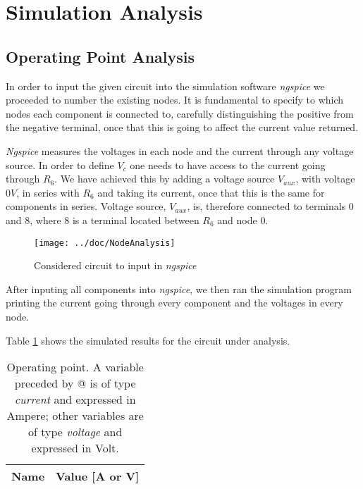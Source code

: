 \section{Simulation Analysis}
\label{sec:simulation}

\subsection{Operating Point Analysis}

In order to input the given circuit into the simulation software \emph{ngspice} we proceeded to number the existing nodes. It is fundamental to specify to which nodes each component is connected to, carefully distinguishing the positive from the negative terminal, once that this is going to affect the current value returned.

\emph{Ngspice} measures the voltages in each node and the current through any voltage source. In order to define $V_c$ one needs to have access to the current going through $R_6$. We have achieved this by adding a voltage source $V_{aux}$, with voltage $0V$, in series with $R_6$ and taking its current, once that this is the same for components in series. Voltage source, $V_{aux}$, is, therefore connected to terminals 0 and 8, where 8 is a terminal located between $R_6$ and node 0.

\begin{figure}[H]
  \centering
  \texttt{[image: ../doc/NodeAnalysis]}
  \caption{Considered circuit to input in \emph{ngspice}}
  \label{fig:fignodos}
\end{figure}

After inputing all components into \emph{ngspice}, we then ran the simulation program printing the current going through every component and the voltages in every node.


Table \ref{tab:ngspice} shows the simulated results for the circuit
under analysis.

\begin{table}[H]
  \centering
  \begin{tabular}{|l|r|}
    \hline
    {\bf Name} & {\bf Value [A or V]} \\ \hline
    
  \end{tabular}
  \caption{Operating point. A variable preceded by @ is of type {\em current}
    and expressed in Ampere; other variables are of type {\it voltage} and expressed in
    Volt.}
  \label{tab:ngspice}
\end{table}


